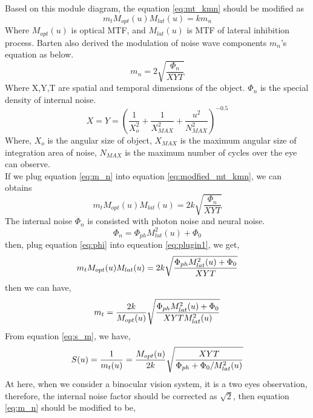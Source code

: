 \documentclass{article}
\begin{document}
Based on this module diagram, the equation \eqref{eq:mt_kmn} should be modified as
\begin{equation}
    \label{eq:modfied_mt_kmn}
    m_tM_{opt}(u)M_{lat}(u) = km_n
\end{equation}
Where $M_{opt}(u)$ is optical MTF, and $M_{lat}(u)$ is MTF of lateral inhibition process. Barten also derived the modulation of noise wave components $m_n$'s equation as below.
\begin{equation}
    \label{eq:m_n}
    m_n = 2\sqrt{\frac{\Phi_n}{XYT}}
\end{equation}
Where X,Y,T are spatial and temporal dimensions of the object. $\Phi_n$ is the special density of internal noise.\\
\begin{equation}
    \label{eq:XY}
    X = Y = (\frac{1}{X_o^2} + \frac{1}{X_{MAX}^2} + \frac{u^2}{N_{MAX}^2})^{-0.5}
\end{equation}
Where, $X_o$ is the angular size of object, $X_{MAX}$ is the maximum angular size of integration area of noise, $N_{MAX}$ is the maximum number of cycles over the eye can observe. \\
If we plug equation \eqref{eq:m_n} into equation \eqref{eq:modfied_mt_kmn}, we can obtains
\begin{equation}
    \label{eq:plugin1}
     m_tM_{opt}(u)M_{lat}(u) = 2k\sqrt{\frac{\Phi_n}{XYT}}
\end{equation}
The internal noise $\Phi_n$ is consisted with photon noise and neural noise.
\begin{equation}
    \label{eq:phi}
     \Phi_n = \Phi_{ph}M_{lat}^2(u) + \Phi_0
\end{equation}
then, plug equation \eqref{eq:phi} into equeation \eqref{eq:plugin1}, we get,
\begin{equation}
    \centering
    \label{eq:plugin2}
     m_tM_{opt}(u)M_{lat}(u) = 2k\sqrt{ \frac{\Phi_{ph}M_{lat}^2(u) + \Phi_0}{XYT}}
\end{equation}
then we can have,
\begin{equation}
    \centering
    \label{eq:mt2}
     m_t = \frac{2k}{M_{opt}(u)}\sqrt{ \frac{\Phi_{ph}M_{lat}^2(u) + \Phi_0}{XYTM_{lat}^2(u)}}
\end{equation}
From equation \eqref{eq:s_m}, we have,
\begin{equation}
    \centering
    \label{eq:s2}
     S(u) = \frac{1}{m_t(u)}  = \frac{M_{opt}(u)}{2k}\sqrt{ \frac{XYT}{\Phi_{ph} + \Phi_0/M_{lat}^2(u)}}
\end{equation}
At here, when we consider a binocular vision system, it is a two eyes observation, therefore, the internal noise factor should be corrected as $\sqrt{2}$, then equation \eqref{eq:m_n} should be modified to be,
\end{document}
